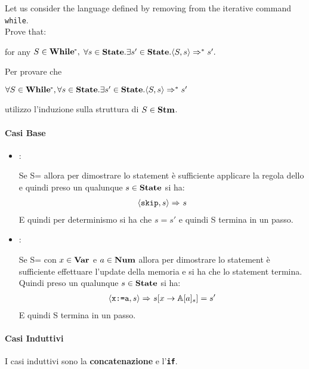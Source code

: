 \newcommand{\whilem}{\syntacticCategory{While\textsuperscript{-}}}
\newcommand{\exOne}{$\forall{}S\in\whilem,\forall{}s\in\states.\exists s'\in\states.\confSs{S}{s}\Rar{*}s'$}

{
	Let us consider the language \whilem{} defined by removing from \while{}
	the iterative command \texttt{while}.  \\
	Prove that: 
	\begin{center}
    for any 
	$S\in\whilem,$
    $ \forall{}s\in\mbox{\textbf{State}}.\exists s'\in\mbox{\textbf{State}}.\langle{}S, s\rangle{}\Rightarrow^{*}s'. $
	\end{center}
}

{
	Per provare che
	\begin{center}
		\exOne{} 
	\end{center} 
    utilizzo l'induzione sulla struttura di $S\in\mbox{\textbf{Stm}}$.
	
\paragraph{Casi Base} 
	\begin{itemize}
	
	\item {}: 
	\casespace{}
	
	Se S=\skipistr{} allora per dimostrare lo
	statement è sufficiente applicare la regola dello \skipSOS{} e quindi preso
	un qualunque $s\in\mbox{\textbf{State}}$ si ha:
	\begin{align*}
	\langle{}\textrm{\normalfont{\texttt{skip}}}, s\rangle{}\Rightarrow^{}s
	\end{align*}
	E quindi per determinismo si ha che $s=s'$ e quindi S termina in un passo.
	\postcasespace{}

	\item {}: 
	
	\casespace{}
	
	Se S= con $x\in\mbox{\textbf{Var}}$
	e $a\in\mbox{\textbf{Num}}$ allora per dimostrare lo statement è sufficiente effettuare
	l'update della memoria e si ha che lo statement termina. 
	\\
	Quindi preso un
	qualunque $s\in\mbox{\textbf{State}}$ si ha:
	\begin{align*}
	\langle{}\textrm{\normalfont{\texttt{x:=a}}}, s\rangle{}\Rightarrow^{}s[x\rightarrow{}\mathbb{A}[a]_s]=s'
	\end{align*}
	E quindi S termina in un passo.
	\postcasespace
	\end{itemize}
	

\paragraph{Casi Induttivi} 	
I casi induttivi sono la \textbf{concatenazione} e l'\textbf{\texttt{if}}. 
	\begin{itemize}


\end{itemize}}
